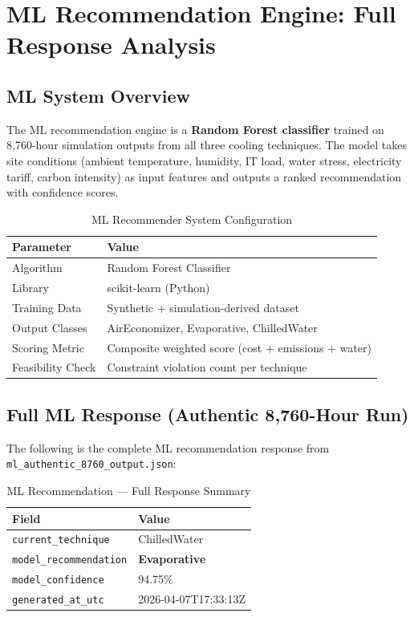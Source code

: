 \documentclass[12pt,a4paper]{report}
\begin{document}
\newpage

\chapter{ML Recommendation Engine: Full Response Analysis}
\label{ch:ml}

\section{ML System Overview}

The ML recommendation engine is a \textbf{Random Forest classifier} trained on 8{,}760-hour
simulation outputs from all three cooling techniques. The model takes site conditions
(ambient temperature, humidity, IT load, water stress, electricity tariff, carbon intensity)
as input features and outputs a ranked recommendation with confidence scores.

\begin{table}[H]
\centering
\caption{ML Recommender System Configuration}
\label{tab:ml_config}
\renewcommand{\arraystretch}{1.3}
\begin{tabular}{ll}
\toprule
\textbf{Parameter} & \textbf{Value} \\
\midrule
Algorithm & Random Forest Classifier \\
Library & scikit-learn (Python) \\
Training Data & Synthetic + simulation-derived dataset \\
Output Classes & AirEconomizer, Evaporative, ChilledWater \\
Scoring Metric & Composite weighted score (cost + emissions + water) \\
Feasibility Check & Constraint violation count per technique \\
\bottomrule
\end{tabular}
\end{table}

\section{Full ML Response (Authentic 8{,}760-Hour Run)}

The following is the complete ML recommendation response from \texttt{ml\_authentic\_8760\_output.json}:

\begin{table}[H]
\centering
\caption{ML Recommendation --- Full Response Summary}
\label{tab:ml_full}
\renewcommand{\arraystretch}{1.3}
\begin{tabular}{ll}
\toprule
\textbf{Field} & \textbf{Value} \\
\midrule
\texttt{current\_technique} & ChilledWater \\
\texttt{model\_recommendation} & \textbf{Evaporative} \\
\texttt{model\_confidence} & 94.75\% \\
\texttt{generated\_at\_utc} & 2026-04-07T17:33:13Z \\
\bottomrule
\end{tabular}
\end{table}
\end{document}
